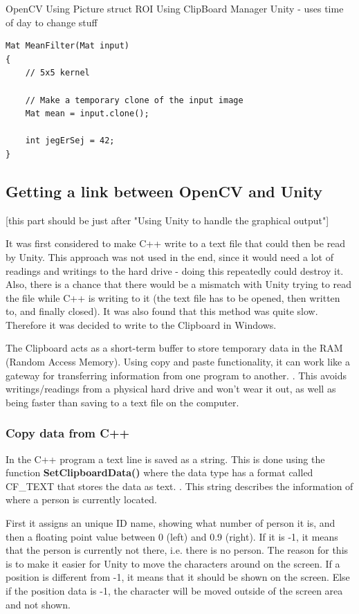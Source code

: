 OpenCV
Using Picture struct
ROI
Using ClipBoard Manager
Unity - uses time of day to change stuff

\begin{lstlisting}
Mat MeanFilter(Mat input)
{
	// 5x5 kernel

	// Make a temporary clone of the input image
	Mat mean = input.clone();

	int jegErSej = 42;
}
\end{lstlisting}

\subsection{Getting a link between OpenCV and Unity}
[this part should be just after "Using Unity to handle the graphical output"]

It was first considered to make C++ write to a text file that could then be read by Unity. This approach was not used in the end, since it would need a lot of readings and writings to the hard drive - doing this repeatedly could destroy it. Also, there is a chance that there would be a mismatch with Unity trying to read the file while C++ is writing to it (the text file has to be opened, then written to, and finally closed). It was also found that this method was quite slow. Therefore it was decided to write to the Clipboard in Windows.

The Clipboard acts as a short-term buffer to store temporary data in the RAM (Random Access Memory). Using copy and paste functionality, it can work like a gateway for transferring information from one program to another. \citep{clipboard1}. This avoids writings/readings from a physical hard drive and won't wear it out, as well as being faster than saving to a text file on the computer.

\subsubsection{Copy data from C++}
In the C++ program a text line is saved as a string. This is done using the function \textbf{SetClipboardData()} where the data type has a format called CF\_TEXT that stores the data as text.\citep{clipboard2} \citep{clipboard3}. This string describes the information of where a person is currently located.

First it assigns an unique ID name, showing what number of person it is, and then a floating point value between 0 (left) and 0.9 (right). If it is -1, it means that the person is currently not there, i.e. there is no person. The reason for this is to make it easier for Unity to move the characters around on the screen. If a position is different from -1, it means that it should be shown on the screen. Else if the position data is -1, the character will be moved outside of the screen area and not shown.

